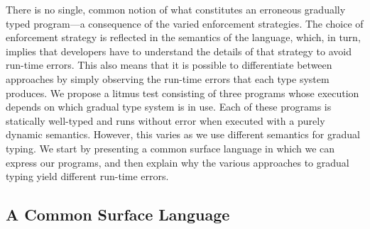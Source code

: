 \documentclass[USenglish]{tex/lipics-v2016}
\begin{document}
\vspace{-7mm}
\noindent
There is no single, common notion of what constitutes an erroneous gradually
typed program---a consequence of the varied enforcement strategies. The choice
of enforcement strategy is reflected in the semantics of the language,
which, in turn, implies that developers have to understand the details of
that strategy to avoid run-time errors.  This also
means that it is possible to differentiate between approaches by simply
observing the run-time errors that each type system produces. We propose a
litmus test consisting of three programs whose execution depends on which
gradual type system is in use. Each of these programs is statically 
well-typed and runs without error when executed with a purely dynamic semantics.
However, this varies as we use different semantics for gradual typing.
We start by presenting a common surface language in which we can
express our programs, and then explain why the various approaches to gradual
typing yield different run-time errors.

\subsection{A Common Surface Language}
\end{document}
